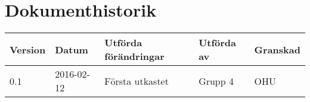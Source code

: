 \documentclass[11pt]{article}
\begin{document}
\tableofcontents

\pagebreak
\section*{Dokumenthistorik}
\begin{table}[h]
\begin{tabular}{|l|l|l|l|l|} \hline

\textbf{Version} & \textbf{Datum} & \textbf{Utförda förändringar} & \textbf{Utförda av} & \textbf{Granskad} \\ \hline
0.1 & 2016-02-12 &  Första utkastet & Grupp 4 & OHU \\ \hline
\end{tabular}
\end{table}

\pagebreak
{}
\end{document}
